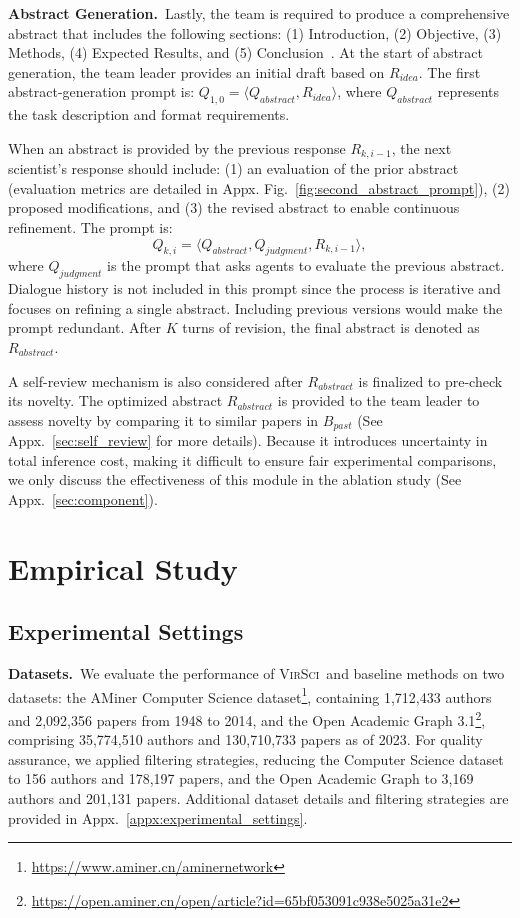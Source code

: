\documentclass[11pt]{article}
\def\modelname{\textsc{VirSci\xspace}}
\begin{document}
\noindent \textbf{Abstract Generation.}~Lastly, the team is required to produce a comprehensive abstract that includes the following sections: (1) Introduction, (2) Objective, (3) Methods, (4) Expected Results, and (5) Conclusion~\citep{alexandrov2007writing}. At the start of abstract generation, the team leader provides an initial draft based on $R_{idea}$. The first abstract-generation prompt is: $Q_{1,0}=\langle Q_{abstract},R_{idea}\rangle$, where $Q_{abstract}$ represents the task description and format requirements.

When an abstract is provided by the previous response $R_{k,i-1}$, the next scientist’s response should include: (1) an evaluation of the prior abstract (evaluation metrics are detailed in Appx. Fig.~\ref{fig:second_abstract_prompt}), (2) proposed modifications, and (3) the revised abstract to enable continuous refinement. The prompt is: \begin{equation}\label{origin_abstract}
    Q_{k,i}=\langle Q_{abstract},Q_{judgment},R_{k,i-1}\rangle,
\end{equation}
where $Q_{judgment}$ is the prompt that asks agents to evaluate the previous abstract. Dialogue history is not included in this prompt since the process is iterative and focuses on refining a single abstract. Including previous versions would make the prompt redundant. After $K$ turns of revision, the final abstract is denoted as $R_{abstract}$.

A self-review mechanism is also considered after $R_{abstract}$ is finalized to pre-check its novelty. The optimized abstract $R_{abstract}$ is provided to the team leader to assess novelty by comparing it to similar papers in $B_{past}$ (See Appx.~\ref{sec:self_review} for more details). Because it introduces uncertainty in total inference cost, making it difficult to ensure fair experimental comparisons, we only discuss the effectiveness of this module in the ablation study (See Appx.~\ref{sec:component}).

\section{Empirical Study}
\subsection{Experimental Settings}
\label{sec:experimental_settings}
\noindent \textbf{Datasets.}~We evaluate the performance of \modelname\ and baseline methods on two datasets: the AMiner Computer Science dataset\footnote{\url{https://www.aminer.cn/aminernetwork}}, containing 1,712,433 authors and 2,092,356 papers from 1948 to 2014, and the Open Academic Graph 3.1\footnote{\url{https://open.aminer.cn/open/article?id=65bf053091c938e5025a31e2}}, comprising 35,774,510 authors and 130,710,733 papers as of 2023. For quality assurance, we applied filtering strategies, reducing the Computer Science dataset to 156 authors and 178,197 papers, and the Open Academic Graph to 3,169 authors and 201,131 papers. Additional dataset details and filtering strategies are provided in Appx.~\ref{appx:experimental_settings}.
\end{document}

